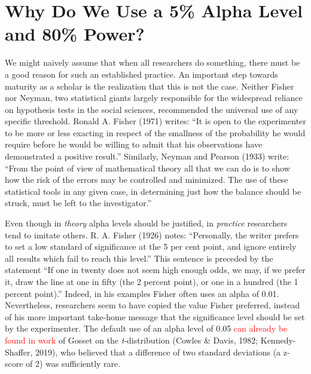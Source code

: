 \documentclass[
  english,
  ,man, a4paper,floatsintext]{apa6}
\begin{document}
\hypertarget{why-do-we-use-a-5-alpha-level-and-80-power}{%
\section{Why Do We Use a 5\% Alpha Level and 80\% Power?}\label{why-do-we-use-a-5-alpha-level-and-80-power}}

We might naively assume that when all researchers do something, there must be a good reason for such an established practice. An important step towards maturity as a scholar is the realization that this is not the case. Neither Fisher nor Neyman, two statistical giants largely responsible for the widespread reliance on hypothesis tests in the social sciences, recommended the universal use of any specific threshold. Ronald A. Fisher (1971) writes: ``It is open to the experimenter to be more or less exacting in respect of the smallness of the probability he would require before he would be willing to admit that his observations have demonstrated a positive result.'' Similarly, Neyman and Pearson (1933) write: ``From the point of view of mathematical theory all that we can do is to show how the risk of the errors may be controlled and minimized. The use of these statistical tools in any given case, in determining just how the balance should be struck, must be left to the investigator.''

Even though in \emph{theory} alpha levels should be justified, in \emph{practice} researchers tend to imitate others. R. A. Fisher (1926) notes: ``Personally, the writer prefers to set a low standard of significance at the 5 per cent point, and ignore entirely all results which fail to reach this level.'' This sentence is preceded by the statement ``If one in twenty does not seem high enough odds, we may, if we prefer it, draw the line at one in fifty (the 2 percent point), or one in a hundred (the 1 percent point).'' Indeed, in his examples Fisher often uses an alpha of 0.01.
Nevertheless, researchers seem to have copied the value Fisher preferred, instead of his more important take-home message that the significance level should be set by the experimenter. The default use of an alpha level of 0.05 \textcolor{red}{can already be found in work} of Gosset on the \emph{t}-distribution (Cowles \& Davis, 1982; Kennedy-Shaffer, 2019), who believed that a difference of two standard deviations (a z-score of 2) was sufficiently rare.
\end{document}
